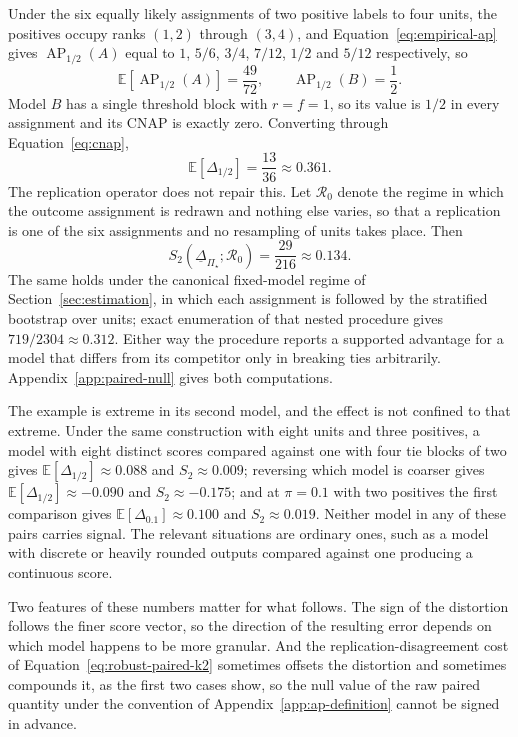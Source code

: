 \documentclass[11pt]{article}
\newcommand{\AP}{\operatorname{AP}}
\newcommand{\Regime}{\mathcal{R}}
\newcommand{\PSet}{\Pi_\star}
\newcommand{\E}{\mathbb{E}}
\newcommand{\RobDelta}{\underline{\Delta}_{\PSet}}
\theoremstyle{remark}
\begin{document}
Under the six equally likely assignments of two positive labels to four units, the positives occupy ranks $(1,2)$ through $(3,4)$, and Equation~\eqref{eq:empirical-ap} gives $\AP_{1/2}(A)$ equal to $1$, $5/6$, $3/4$, $7/12$, $1/2$ and $5/12$ respectively, so
\[
\E\left[\AP_{1/2}(A)\right]=\frac{49}{72},
\qquad
\AP_{1/2}(B)=\frac12 .
\]
Model $B$ has a single threshold block with $r=f=1$, so its value is $1/2$ in every assignment and its CNAP is exactly zero. Converting through Equation~\eqref{eq:cnap},
\[
\E\left[\Delta_{1/2}\right]
=
\frac{13}{36}
\approx
0.361 .
\]
The replication operator does not repair this. Let $\Regime_0$ denote the regime in which the outcome assignment is redrawn and nothing else varies, so that a replication is one of the six assignments and no resampling of units takes place. Then
\[
S_2(\RobDelta;\Regime_0)
=
\frac{29}{216}
\approx
0.134 .
\]
The same holds under the canonical fixed-model regime of Section~\ref{sec:estimation}, in which each assignment is followed by the stratified bootstrap over units; exact enumeration of that nested procedure gives $719/2304\approx0.312$. Either way the procedure reports a supported advantage for a model that differs from its competitor only in breaking ties arbitrarily. Appendix~\ref{app:paired-null} gives both computations.

The example is extreme in its second model, and the effect is not confined to that extreme. Under the same construction with eight units and three positives, a model with eight distinct scores compared against one with four tie blocks of two gives $\E[\Delta_{1/2}]\approx0.088$ and $S_2\approx0.009$; reversing which model is coarser gives $\E[\Delta_{1/2}]\approx-0.090$ and $S_2\approx-0.175$; and at $\pi=0.1$ with two positives the first comparison gives $\E[\Delta_{0.1}]\approx0.100$ and $S_2\approx0.019$. Neither model in any of these pairs carries signal. The relevant situations are ordinary ones, such as a model with discrete or heavily rounded outputs compared against one producing a continuous score.

Two features of these numbers matter for what follows. The sign of the distortion follows the finer score vector, so the direction of the resulting error depends on which model happens to be more granular. And the replication-disagreement cost of Equation~\eqref{eq:robust-paired-k2} sometimes offsets the distortion and sometimes compounds it, as the first two cases show, so the null value of the raw paired quantity under the convention of Appendix~\ref{app:ap-definition} cannot be signed in advance.
\end{document}
